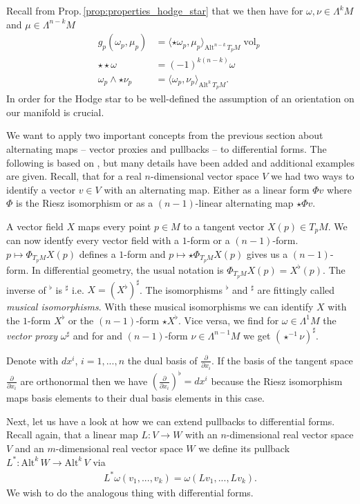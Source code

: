 \documentclass[12pt,a4paper]{article}
\numberwithin{equation}{subsection}
\numberwithin{lemma}{subsection}
\theoremstyle{definition}
\DeclareMathOperator{\vol}{vol}
\newcommand{\alternating}[2]{ {\text{Alt}^{#1}\,#2} }
\begin{document}
Recall from Prop.\,\ref{prop:properties_hodge_star} that we then have for $\omega, \nu \in \Lambda^k M$ and 
$\mu \in \Lambda^{n-k} M$
\begin{align*}
    g_p(\omega_p, \mu_p) &= \langle \star \omega_p, \mu_p \rangle _{\alternating{n-k}{T_p M}} \vol_p
    \\ \star \star \omega &= (-1)^{k(n-k)} \omega
    \\ \omega_p \wedge \star \nu_p &= \langle \omega_p, \nu_p \rangle _{\alternating{k}{T_p M}}.
\end{align*}
In order for 
the Hodge star to be well-defined the assumption of an orientation on our 
manifold is crucial. 

We want to apply two important concepts from the previous section about 
alternating maps -- vector proxies and pullbacks -- to differential forms.
The following is based on \cite[Ch.\,6]{arnold}, 
but many details have been
added and additional examples are given.
Recall, that for a real $n$-dimensional vector space $V$ we had two 
ways to identify a vector $v\in V$ with an alternating map. Either as a 
linear form $\Phi v$ where $\Phi$ is the Riesz isomorphism or as a 
$(n-1)$-linear alternating map $\star \Phi v$. 

A vector field $X$ maps every point $p \in M$ to a tangent vector 
$X(p) \in T_p M$. We can now identfy every vector field with a $1$-form or 
a $(n-1)$-form. $p \mapsto \Phi_{T_p M} X(p)$ defines a $1$-form and  
$p \mapsto \star \Phi_{T_p M} X(p)$ gives us a $(n-1)$-form. In differential 
geometry, the usual notation is
$\Phi_{T_p M} X(p) = X^\flat(p)$. The inverse of $^\flat$ is $^\sharp$ i.e. 
$X = (X^\flat)^\sharp$.
The isomorphisms $^\flat$ and $^\sharp$ 
are fittingly called \textit{musical isomorphisms}. 
With these musical isomorphisms we can identify $X$ with the $1$-form 
$X^\flat$ or the $(n-1)$-form $\star X^\flat$. Vice versa, we find 
for $\omega \in \Lambda^1 M$ the \textit{vector proxy} $\omega ^\sharp$ and for 
and $(n-1)$-form $\nu \in \Lambda^{n-1} M$ we get $(\star^{-1} \nu)^\sharp$.

Denote with $dx^i$, $i=1, ..., n$ the dual basis of 
$\frac{\partial}{\partial x_i}$.
If the basis of the tangent space $\frac{\partial}{\partial x_i}$ are 
orthonormal then we have $(\frac{\partial}{\partial x_i})^\flat = dx^i$ 
because the Riesz isomorphism maps basis elements to their dual basis elements
in this case.

Next, let us have a look at how we can extend pullbacks to differential forms.
Recall again, that a linear map $L: V \rightarrow W$ with an 
$n$-dimensional real vector space $V$ and an 
$m$-dimensional real vector space $W$ we define its pullback 
$L^*: \alternating{k}{W} \rightarrow \alternating{k}{V}$ via 
\begin{align*}
    L^*\omega (v_1, ..., v_k) = \omega (Lv_1, ..., L v_k).
\end{align*} 
We wish to do the analogous thing with differential forms. 
\end{document}
